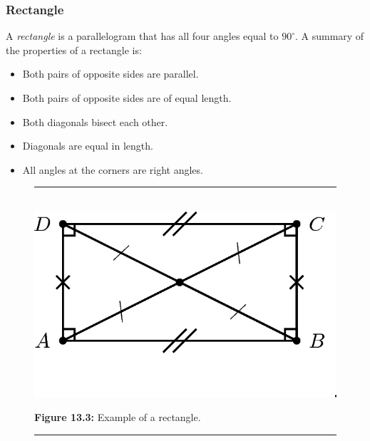            \subsubsection{ Rectangle}
            \nopagebreak
          \label{m39354*id318929}A \textsl{rectangle} is a parallelogram that has all four angles equal to \begin{math}{90}^{\circ }\end{math}. A summary of the properties of a rectangle is:\par 
          \label{m39354*id318954}\begin{itemize}[noitemsep]
            \label{m39354*uid63}\item Both pairs of opposite sides are parallel.
\label{m39354*uid64}\item Both pairs of opposite sides are of equal length.
\label{m39354*uid65}\item Both diagonals bisect each other.
\label{m39354*uid66}\item Diagonals are equal in length.
\label{m39354*uid67}\item All angles at the corners are right angles.
\end{itemize}
    \setcounter{subfigure}{0}
	\begin{figure}[H] %
    \begin{center}
    \rule[.1in]{\figurerulewidth}{.005in} \\
        \label{m39354*uid68!!!underscore!!!media}\label{m39354*uid68!!!underscore!!!printimage}\includegraphics{col11306.imgs/m39354_MG10C13_042.png} %
      \vspace{2pt}
    \vspace{\rubberspace}\par \begin{cnxcaption}
	  \small \textbf{Figure 13.3: }Example of a rectangle.
	\end{cnxcaption}
    \vspace{.1in}
    \rule[.1in]{\figurerulewidth}{.005in} \\
    \end{center}
 \end{figure}       
        \label{m39354*uid69}
